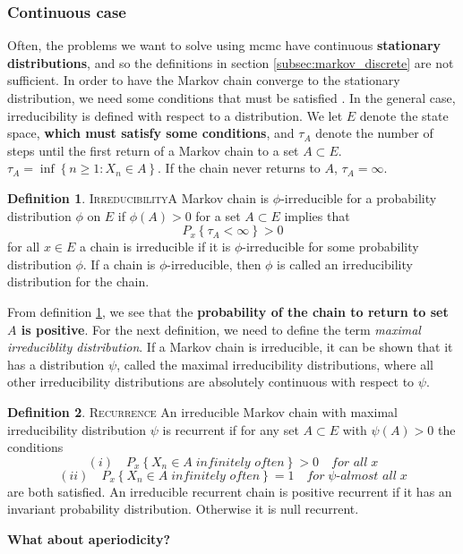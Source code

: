 \documentclass{article}
\theoremstyle{definition}
\newtheorem{definition}{Definition}[section]
\begin{document}
\subsubsection{Continuous case}
Often, the problems we want to solve using \gls{mcmc} have continuous \textbf{stationary distributions}, and so the definitions in section \ref{subsec:markov_discrete} are not sufficient. In order to have the Markov chain converge to the stationary distribution, we need some conditions that must be satisfied \cite{MCMC_in_pract}. In the general case, irreducibility is defined with respect to a distribution. We let $E$ denote the state space, \textbf{which must satisfy some conditions}, and $\tau_A$ denote the number of steps until the first return of a Markov chain to a set $A\subset E$.  $\tau_A = \inf\left\{n\geq 1 : X_n \in A\right\}$. If the chain never returns to $A$, $\tau_A = \infty$.
\begin{definition}{\textsc{Irreducibility}}\label{def:gen_irr}
   A Markov chain is $\phi$-irreducible for a probability distribution $\phi$ on $E$ if $\phi\left(A\right) > 0$ for a set $A\subset E$ implies that $$P_x\left\{\tau_A < \infty\right\} > 0$$ for all $x\in E$ a chain is irreducible if it is $\phi$-irreducible for some probability distribution $\phi$. If a chain is $\phi$-irreducible, then $\phi$ is called an irreducibility distribution for the chain. 
\end{definition}
From definition \ref{def:gen_irr}, we see that the \textbf{probability of the chain to return to set $A$ is positive}.  
For the next definition, we need to define the term \textit{maximal irreduciblity distribution}. If a Markov chain is irreducible, it can be shown that it has a distribution $\psi$, called the maximal irreducibility distributions, where all other irreducibility distributions are absolutely continuous with respect to $\psi$.  
\begin{definition}{\textsc{Recurrence}}
An irreducible Markov chain with maximal irreducibility distribution $\psi$ is recurrent if for any set $A\subset E$ with $\psi\left(A\right)>0$ the conditions
$$(i)\quad P_x \left\{X_n \in A \; \textit{infinitely often}\right\} > 0\quad \textit{for all}\; x$$ 
$$(ii) \quad P_x\left\{X_n\in A \; \textit{infinitely often} \right\} = 1 \quad \textit{for}\;\psi \textit{-almost all} \; x$$
are both satisfied. An irreducible recurrent chain is positive recurrent if it has an invariant probability distribution.
Otherwise it is null recurrent. 
\end{definition}
\textbf{What about aperiodicity?}
\end{document}

